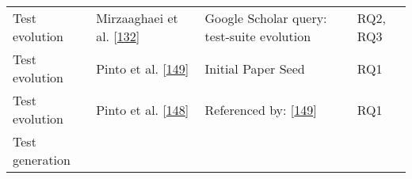 \documentclass[]{book}
\begin{document}
\begin{longtable}[]{@{}llll@{}}
\begin{minipage}[t]{0.18\columnwidth}\raggedright\strut
Test evolution\strut
\end{minipage} & \begin{minipage}[t]{0.16\columnwidth}\raggedright\strut
Mirzaaghaei et al.
{[}\protect\hyperlink{ref-supportingtestsuite}{132}{]}\strut
\end{minipage} & \begin{minipage}[t]{0.50\columnwidth}\raggedright\strut
Google Scholar query: test-suite evolution\strut
\end{minipage} & \begin{minipage}[t]{0.04\columnwidth}\raggedright\strut
RQ2, RQ3\strut
\end{minipage}\tabularnewline
\begin{minipage}[t]{0.18\columnwidth}\raggedright\strut
Test evolution\strut
\end{minipage} & \begin{minipage}[t]{0.16\columnwidth}\raggedright\strut
Pinto et al.
{[}\protect\hyperlink{ref-pinto2012understanding}{149}{]}\strut
\end{minipage} & \begin{minipage}[t]{0.50\columnwidth}\raggedright\strut
Initial Paper Seed\strut
\end{minipage} & \begin{minipage}[t]{0.04\columnwidth}\raggedright\strut
RQ1\strut
\end{minipage}\tabularnewline
\begin{minipage}[t]{0.18\columnwidth}\raggedright\strut
Test evolution\strut
\end{minipage} & \begin{minipage}[t]{0.16\columnwidth}\raggedright\strut
Pinto et al. {[}\protect\hyperlink{ref-pinto2013}{148}{]}\strut
\end{minipage} & \begin{minipage}[t]{0.50\columnwidth}\raggedright\strut
Referenced by:
{[}\protect\hyperlink{ref-pinto2012understanding}{149}{]}\strut
\end{minipage} & \begin{minipage}[t]{0.04\columnwidth}\raggedright\strut
RQ1\strut
\end{minipage}\tabularnewline
\begin{minipage}[t]{0.18\columnwidth}\raggedright\strut
Test generation\strut
\end{minipage} & \begin{minipage}[t]{0.16\columnwidth}\raggedright\strut

\end{minipage}
\end{longtable}
\end{document}
